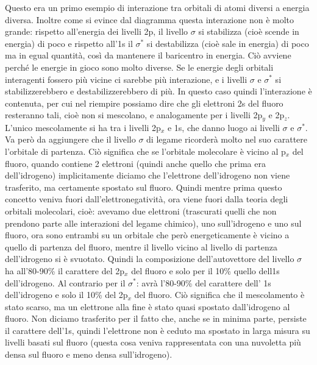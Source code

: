 Questo era un primo esempio di interazione tra orbitali di atomi diversi a energia diversa. Inoltre come si evince dal diagramma questa interazione non è molto grande: rispetto all'energia dei livelli 2p, il livello $\sigma$ si stabilizza (cioè scende in energia) di poco e rispetto all'1s il $\sigma^*$ si destabilizza (cioè sale in energia) di poco ma in egual quantità, così da mantenere il baricentro in energia. Ciò avviene perché le energie in gioco sono molto diverse. Se le energie degli orbitali interagenti fossero più vicine ci sarebbe più interazione, e i livelli $\sigma$ e $\sigma^*$ si stabilizzerebbero e destabilizzerebbero di più. In questo caso quindi l'interazione è contenuta, per cui nel riempire possiamo dire che gli elettroni 2s del fluoro resteranno tali, cioè non si mescolano, e analogamente per i livelli 2p$_y$ e 2p$_z$. L'unico mescolamente si ha tra i livelli 2p$_x$ e 1s, che danno luogo ai livelli $\sigma$ e $\sigma^*$. Va però da aggiungere che il livello $\sigma$ di legame ricorderà molto nel suo carattere l'orbitale di partenza. Ciò significa che se l'orbitale molecolare è vicino al p$_x$ del fluoro, quando contiene 2 elettroni (quindi anche quello che prima era dell'idrogeno) implicitamente diciamo che l'elettrone dell'idrogeno non viene trasferito, ma certamente spostato sul fluoro. Quindi mentre prima questo concetto veniva fuori dall'elettronegatività, ora viene fuori dalla teoria degli orbitali molecolari, cioè: avevamo due elettroni (trascurati quelli che non prendono parte alle interazioni del legame chimico), uno sull'idrogeno e uno sul fluoro, ora sono entrambi su un orbitale che però energeticamente è vicino a quello di partenza del fluoro, mentre il livello vicino al livello di partenza dell'idrogeno si è svuotato. Quindi la composizione dell'autovettore del livello $\sigma$ ha all'80-90\% il carattere del 2p$_x$ del fluoro e solo per il 10\% quello dell1s dell'idrogeno. Al contrario per il $\sigma^*$: avrà l'80-90\% del carattere dell' 1s dell'idrogeno e solo il 10\% del 2p$_x$ del fluoro. Ciò significa che il mescolamento è stato scarso, ma un elettrone alla fine è stato quasi spostato dall'idrogeno al fluoro. Non diciamo trasferito per il fatto che, anche se in minima parte, persiste il carattere dell'1s, quindi l'elettrone non è ceduto ma spostato in larga misura su livelli basati sul fluoro (questa cosa veniva rappresentata con una nuvoletta più densa sul fluoro e meno densa sull'idrogeno).

